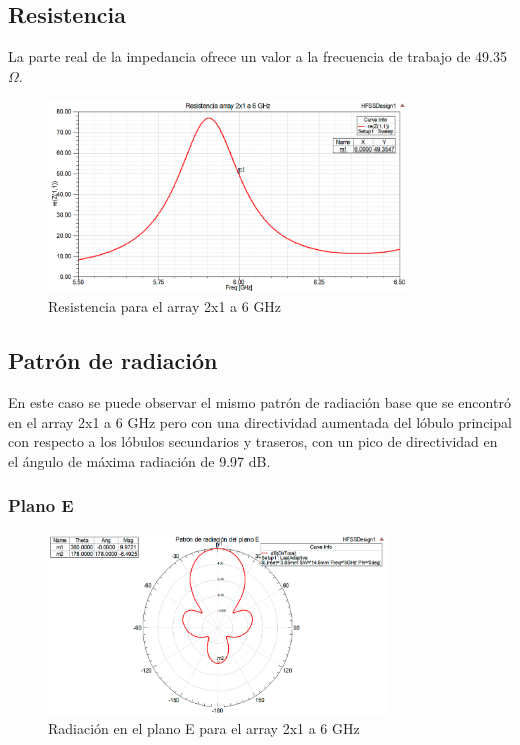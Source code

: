 \subsection{Resistencia}
\par La parte real de la impedancia ofrece un valor a la frecuencia de trabajo de 49.35 $\Omega$.
\\
\begin{figure}[H]
    \centering
        \includegraphics[width=0.85\textwidth]{archivos/analisis/2x12/3}
        \caption{Resistencia para el array 2x1 a 6 GHz}
        \label{fig:resis2x12}
\end{figure}

\subsection{Patrón de radiación}
\par En este caso se puede observar el mismo patrón de radiación base que se encontró en el array 2x1 a 6 GHz pero con una directividad aumentada del lóbulo principal con respecto a los lóbulos secundarios y traseros, con un pico de directividad en el ángulo de máxima radiación de 9.97 dB. 
\\
\subsubsection{Plano E}
\begin{figure}[H]
    \centering
        \includegraphics[width=0.8\textwidth]{archivos/analisis/2x12/4}
        \caption{Radiación en el plano E para el array 2x1 a 6 GHz}
        \label{fig:E2x12}
\end{figure}

